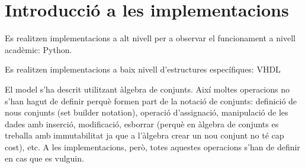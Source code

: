 

\chapter{Introducció a les implementacions}


Es realitzen implementacions a alt nivell per a observar el funcionament a nivell acadèmic: Python.

Es realitzen implementacions a baix nivell d'estructures específiques: VHDL




El model s'ha descrit utilitzant àlgebra de conjunts. Així moltes operacions no s'han hagut de definir perquè formen part de la notació de conjunts: definició de nous conjunts (set builder notation), operació d'assignació, manipulació de les dades amb inserció, modificació, esborrar (perquè en àlgebra de conjunts es treballa amb immutabilitat ja que a l'àlgebra crear un nou conjunt no té cap cost), etc.  A les implementacions, però, totes aquestes operacions s'han de definir en cas que es vulguin.

















